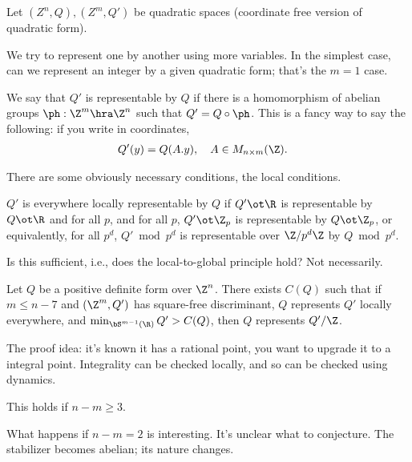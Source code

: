 \begin{ex}
Let $(Z^n,Q),(Z^m,Q')$ be quadratic spaces (coordinate free version of quadratic form).

We try to represent one by another using more variables. In the simplest case, can we represent an integer by a given quadratic form; that's the $m=1$ case.

We say that $Q'$ is representable by $Q$ if there is a homomorphism of abelian groups $\ph:\Z^m\hra \Z^n$ such that $Q'=Q\circ\ph$. This is a fancy way to say the following: if you write in coordinates,
\begin{align}%
Q'(y) &= Q(A.y), \quad A\in M_{n\times m}(\Z).
\end{align}
\end{ex}

There are some obviously necessary conditions, the local conditions.
\begin{df}
$Q'$ is everywhere locally representable by $Q$ if $Q'\ot \R$ is representable by $Q\ot \R$ and for all $p$, and for all $p$, $Q'\ot \Z_p$ is representable by $Q\ot \Z_p$, or equivalently, for all $p^d$, $Q'\bmod {p^d}$ is representable over $\Z/p^d\Z$ by $Q\bmod{p^d}$. 
\end{df}
Is this sufficient, i.e., does the local-to-global principle hold? Not necessarily. 


\begin{thm}
Let $Q$ be a positive definite form over $\Z^n$. There exists $C(Q)$ such that if $m\le n-7$ and $(\Z^m,Q')$ has square-free discriminant, $Q$ represents $Q'$ locally everywhere, and $\min_{\bS^{m-1}(\R)} Q' %
>C(Q)$, then $Q$ represents $Q'/\Z$. 
\end{thm}
The proof idea: it's known it has a rational point, you want to upgrade it to a integral point. Integrality can be checked locally, and so can be checked using dynamics.
\begin{conj}
This holds if $n-m\ge 3$. 
\end{conj}
What happens if $n-m=2$ is interesting. It's unclear what to conjecture. The stabilizer becomes abelian; its nature changes. %

